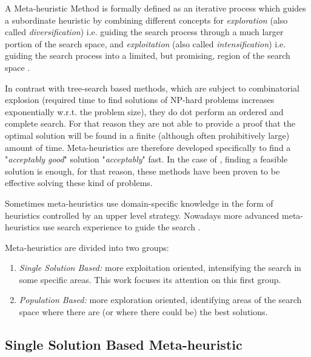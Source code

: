 A Meta-heuristic Method is formally defined as an iterative process which guides a subordinate heuristic by combining different concepts for \textit{exploration} (also called \textit{diversification}) i.e. guiding the search process through a much larger portion of the search space, and \textit{exploitation} (also called \textit{intensification}) i.e. guiding the search process into a limited, but promising, region of the search space \cite{Osman1996}.

In contrast with tree-search based methods, which are subject to combinatorial explosion (required time to find solutions of NP-hard problems increases exponentially w.r.t. the problem size), they do dot perform an ordered and complete search. For that reason they are not able to provide a proof that the optimal solution will be found in a finite (although often prohibitively large) amount of time. Meta-heuristics are therefore developed specifically to find a "\textit{acceptably good}" solution "\textit{acceptably}" fast. In the case of \csps, finding a feasible solution is enough, for that reason, these methods have been proven to be effective solving these kind of problems.

Sometimes meta-heuristics use domain-specific knowledge in the form of heuristics controlled by an upper level strategy. Nowadays more advanced meta-heuristics use search experience to guide the search \cite{Blum2003}.

Meta-heuristics are divided into two groups: %
\begin{enumerate}%
    \item {\it Single Solution Based:} more exploitation oriented, intensifying the search in some specific areas. This work focuses its attention on this first group.
    \item {\it Population Based:} more exploration oriented, identifying areas of the search space where there are (or where there could be) the best solutions. %
\end{enumerate} %

\subsection{Single Solution Based Meta-heuristic}

